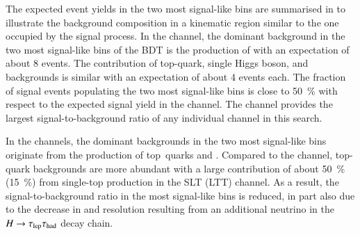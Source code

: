 The expected event yields in the two most signal-like bins are summarised in
 to illustrate the background
composition in a kinematic region similar to the one occupied by the signal
process.
In the \hadhad channel, the dominant background in the two most signal-like bins
of the BDT is the production of \ZHF with an expectation of about 8 events. The
contribution of top-quark, single Higgs boson, and \faketauhadvisC backgrounds is
similar with an expectation of about 4 events each. The fraction of signal
events populating the two most signal-like bins is close to \SI{50}{\percent}
with respect to the expected signal yield in the channel. The \hadhad channel
provides the largest signal-to-background ratio of any individual channel in
this search.

In the \lephad channels, the dominant backgrounds in the two most signal-like
bins originate from the production of top~quarks and \ZHF. Compared to the
\hadhad channel, top-quark backgrounds are more abundant
with a large contribution of about \SI{50}{\percent} (\SI{15}{\percent}) from
single-top production in the SLT (LTT) channel. As a result, the
signal-to-background ratio in the most signal-like bins is reduced, in part also
due to the decrease in \mMMC and \mHH resolution resulting from an additional
neutrino in the $H \to \tau_{\text{lep}}\tau_{\text{had}}$ decay chain.


